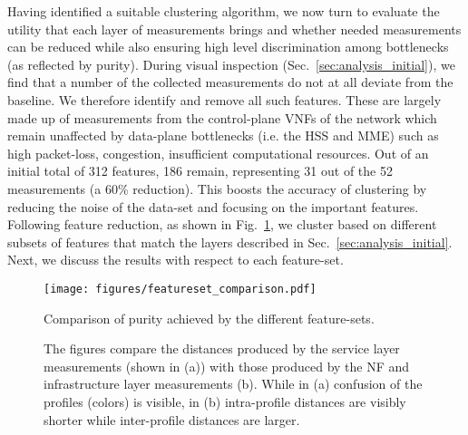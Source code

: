 \documentclass[journal,comsoc]{IEEEtran}
\begin{document}
% 
Having identified a suitable clustering algorithm, we now turn to evaluate the utility that each layer of measurements brings and whether needed measurements can be reduced while also ensuring high level discrimination among bottlenecks (as reflected by purity).
During visual inspection (Sec.~\ref{sec:analysis_initial}), we find that a number of the collected measurements do not at all deviate from the baseline.
We therefore identify and remove all such features.
These are largely made up of measurements from the control-plane VNFs of the network which remain unaffected by data-plane bottlenecks (i.e. the HSS and MME) such as high packet-loss, congestion, insufficient computational resources.
Out of an initial total of 312 features, 186 remain, representing 31 out of the 52 measurements (a 60\% reduction). 
This boosts the accuracy of clustering by reducing the noise of the data-set and focusing on the important features. 
Following feature reduction, as shown in Fig.~\ref{fig:features}, we cluster based on different subsets of features that match the layers described in Sec.~\ref{sec:analysis_initial}.
Next, we discuss the results with respect to each feature-set.

\begin{figure}[t] 
	\centering
	\texttt{[image: figures/featureset\_comparison.pdf]}
	\vspace{-8mm}
	\caption{Comparison of purity achieved by the different feature-sets.}
	\vspace{-4mm}
	\label{fig:features}
\end{figure}

\begin{figure*}[t]
\begin{center}
\hfill
\vspace{-4mm}
\caption{The figures compare the distances produced by the service layer measurements (shown in (a)) with those produced by the NF and infrastructure layer measurements (b). While in (a) confusion of the profiles (colors) is visible, in (b) intra-profile distances are visibly shorter while inter-profile distances are larger.}
\vspace{-4mm}
\label{fig:distance_plot}
\end{center}
\end{figure*}
\end{document}
